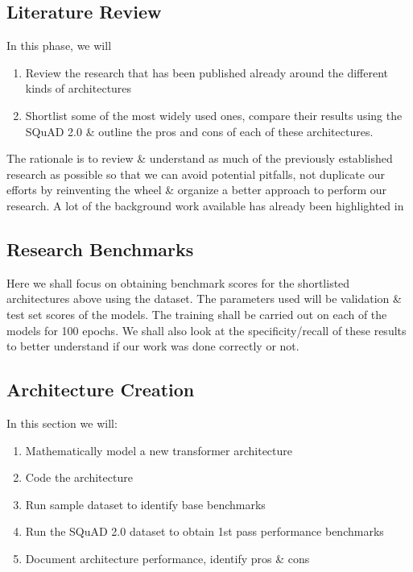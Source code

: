 \documentclass[11pt]{article}
\begin{document}
\subsection{Literature Review}\label{litrev}

In this phase, we will
\begin{enumerate}
    \item Review the research that has been published already around the different kinds of architectures
    \item Shortlist some of the most widely used ones, compare their results using the SQuAD 2.0 \cite{dataset} \& outline the pros and cons of each of these architectures.
\end{enumerate}
The rationale is to review \& understand as much of the previously established research as possible so that we can avoid potential pitfalls, not duplicate our efforts by reinventing the wheel \& organize a better approach to perform our research. A lot of the background work available has already been highlighted in
\subsection{Research Benchmarks}\label{benchmarks}
Here we shall focus on obtaining benchmark scores for the shortlisted architectures above using the dataset\cite{dataset}. The parameters used will be validation \& test set scores of the models. The training shall be carried out on each of the models for 100 epochs. We shall also look at the specificity/recall of these results to better understand if our work was done correctly or not.
\subsection{Architecture Creation}\label{architecturecreation}
In this section we will:

\begin{enumerate}
    \item{Mathematically model a new transformer architecture}
    \item{Code the architecture}
    \item{Run sample dataset to identify base benchmarks}
    \item{Run the SQuAD 2.0 dataset\cite{dataset} to obtain 1st pass performance benchmarks}
    \item{Document architecture performance, identify pros \& cons}
\end{enumerate}
\end{document}
